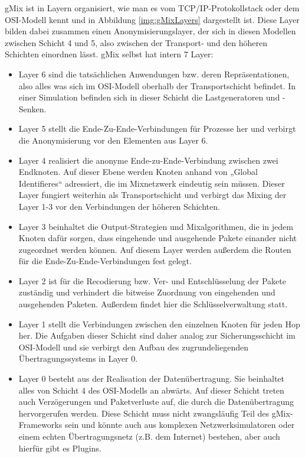 \documentclass[a4paper, 11pt]{article} %
\begin{document}
gMix ist in Layern organisiert, wie man es vom TCP/IP-Protokollstack oder dem OSI-Modell kennt und in Abbildung \ref{img:gMixLayers} dargestellt ist. Diese Layer bilden dabei zusammen einen Anonymisierungslayer, der sich in diesen Modellen zwischen Schicht 4 und 5, also zwischen der Transport- und den höheren Schichten einordnen lässt. gMix selbst hat intern 7 Layer:
\begin{itemize}
	\item Layer 6 sind die tatsächlichen Anwendungen bzw. deren Repräsentationen, also alles was sich im OSI-Modell oberhalb der Transportschicht befindet. In einer Simulation befinden sich in dieser Schicht die Lastgeneratoren und -Senken.
	\item Layer 5 stellt die Ende-Zu-Ende-Verbindungen für Prozesse her und verbirgt die Anonymisierung vor den Elementen aus Layer 6.
	\item Layer 4 realisiert die anonyme Ende-zu-Ende-Verbindung zwischen zwei Endknoten. Auf dieser Ebene werden Knoten anhand von „Global Identifieres“ adressiert, die im Mixnetzwerk eindeutig sein müssen. Dieser Layer fungiert weiterhin als Transportschicht und verbirgt das Mixing der Layer 1-3 vor den Verbindungen der höheren Schichten.
	\item Layer 3 beinhaltet die Output-Strategien und Mixalgorithmen, die in jedem Knoten dafür sorgen, dass eingehende und ausgehende Pakete einander nicht zugeordnet werden können. Auf diesem Layer werden außerdem die Routen für die Ende-Zu-Ende-Verbindungen fest gelegt.
	\item Layer 2 ist für die Recodierung bzw. Ver- und Entschlüsselung der Pakete zuständig und verhindert die bitweise Zuordnung von eingehenden und ausgehenden Paketen. Außerdem findet hier die Schlüsselverwaltung statt.
	\item Layer 1 stellt die Verbindungen zwischen den einzelnen Knoten für jeden Hop her. Die Aufgaben dieser Schicht sind daher analog zur Sicherungsschicht im OSI-Modell und sie verbirgt den Aufbau des zugrundeliegenden Übertragungssystems in Layer 0.
	\item Layer 0 besteht aus der Realisation der Datenübertragung. Sie beinhaltet alles von Schicht 4 des OSI-Modells an abwärts. Auf dieser Schicht treten auch Verzögerungen und Paketverluste auf, die durch die Datenübertragung hervorgerufen werden. Diese Schicht muss nicht zwangsläufig Teil des gMix-Frameworks sein und könnte auch aus komplexen Netzwerksimulatoren oder einem echten Übertragungsnetz (z.B. dem Internet) bestehen, aber auch hierfür gibt es Plugins.
\end{itemize}
\end{document}
